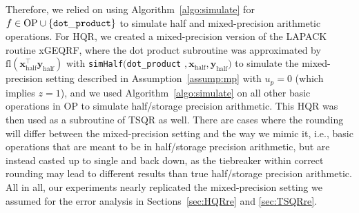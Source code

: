 \documentclass[review,onefignum,onetabnum]{siamart190516}
\newcommand{\F}{\mathbb{F}}
\newcommand{\bb}[1]{\mathbf{#1}}
\newcommand{\fl}{\mathrm{fl}}
\begin{document}
Therefore, we relied on using Algorithm~\ref{algo:simulate} for $f\in \text{OP} \cup\{{\tt dot\_product}\}$ to simulate half and mixed-precision arithmetic operations. 
For HQR, we created a mixed-precision version of the LAPACK routine xGEQRF, where the dot product subroutine was approximated by $\fl(\bb{x}_{\text{half}}^{\top}\bb{y}_{\text{half}})$ with {\tt simHalf}$(${\tt dot\_product} $, \bb{x}_{\text{half}}, \bb{y}_{\text{half}})$ to simulate the mixed-precision setting described in Assumption~\ref{assump:mp} with $u_p = 0$ (which implies $z=1$), and we used Algorithm~\ref{algo:simulate} on all other basic operations in OP to simulate half/storage precision arithmetic. 
This HQR was then used as a subroutine of TSQR as well. 
There are cases where the rounding will differ between the mixed-precision setting and the way we mimic it, i.e., basic operations that are meant to be in half/storage precision arithmetic, but are instead casted up to single and back down, as the tiebreaker within correct rounding may lead to different results than true half/storage precision arithmetic. 
All in all, our experiments nearly replicated the mixed-precision setting we assumed for the error analysis in Sections~\ref{sec:HQRre} and \ref{sec:TSQRre}.\par 
\end{document}
